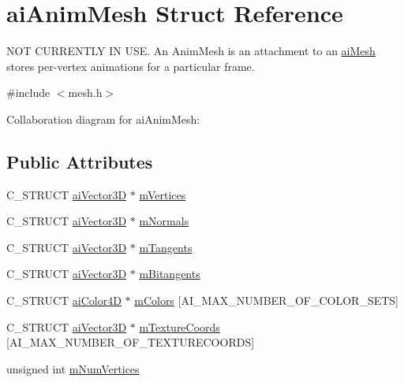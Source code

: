 \hypertarget{structai_anim_mesh}{\section{ai\-Anim\-Mesh Struct Reference}
\label{structai_anim_mesh}
}


N\-O\-T C\-U\-R\-R\-E\-N\-T\-L\-Y I\-N U\-S\-E. An Anim\-Mesh is an attachment to an \hyperlink{structai_mesh}{ai\-Mesh} stores per-\/vertex animations for a particular frame.  




{\ttfamily \#include $<$mesh.\-h$>$}



Collaboration diagram for ai\-Anim\-Mesh\-:
\subsection*{Public Attributes}
\begin{DoxyCompactItemize}
\item 
C\-\_\-\-S\-T\-R\-U\-C\-T \hyperlink{structai_vector3_d}{ai\-Vector3\-D} $\ast$ \hyperlink{structai_anim_mesh_a0ac2dd4c1afd23e6a9293b1d0ded3060}{m\-Vertices}
\item 
C\-\_\-\-S\-T\-R\-U\-C\-T \hyperlink{structai_vector3_d}{ai\-Vector3\-D} $\ast$ \hyperlink{structai_anim_mesh_a64a07a8c5c419b1e006c5302bca4d334}{m\-Normals}
\item 
C\-\_\-\-S\-T\-R\-U\-C\-T \hyperlink{structai_vector3_d}{ai\-Vector3\-D} $\ast$ \hyperlink{structai_anim_mesh_a95dcc49c6d5ecc570ceb54552a0a9625}{m\-Tangents}
\item 
C\-\_\-\-S\-T\-R\-U\-C\-T \hyperlink{structai_vector3_d}{ai\-Vector3\-D} $\ast$ \hyperlink{structai_anim_mesh_a7d60acf4d2b4b59dcc6c88956bfae85f}{m\-Bitangents}
\item 
C\-\_\-\-S\-T\-R\-U\-C\-T \hyperlink{structai_color4_d}{ai\-Color4\-D} $\ast$ \hyperlink{structai_anim_mesh_a4f062d9fac71c6b367fdf0f8638e1ca5}{m\-Colors} \mbox{[}A\-I\-\_\-\-M\-A\-X\-\_\-\-N\-U\-M\-B\-E\-R\-\_\-\-O\-F\-\_\-\-C\-O\-L\-O\-R\-\_\-\-S\-E\-T\-S\mbox{]}
\item 
C\-\_\-\-S\-T\-R\-U\-C\-T \hyperlink{structai_vector3_d}{ai\-Vector3\-D} $\ast$ \hyperlink{structai_anim_mesh_ad24a0451adeb845a53eb2351b9462e0a}{m\-Texture\-Coords} \mbox{[}A\-I\-\_\-\-M\-A\-X\-\_\-\-N\-U\-M\-B\-E\-R\-\_\-\-O\-F\-\_\-\-T\-E\-X\-T\-U\-R\-E\-C\-O\-O\-R\-D\-S\mbox{]}
\item 
unsigned int \hyperlink{structai_anim_mesh_a6bb0d45317a1bbea7f2b7f8191d0c436}{m\-Num\-Vertices}
\end{DoxyCompactItemize}


